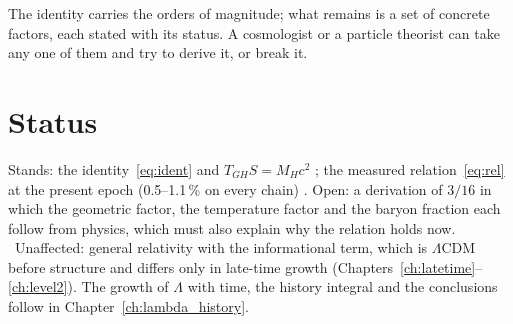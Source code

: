 The identity carries the orders of magnitude; what remains is a set of concrete factors, each stated with its status. A cosmologist or a particle theorist can take any one of them and try to derive it, or break it.

\section{Status}
Stands: the identity~\eqref{eq:ident} and $T_{GH}S=M_Hc^2$ \derived; the measured relation~\eqref{eq:rel} at the present epoch
(0.5--1.1\,\% on every chain) \observed. Open: a derivation of $3/16$ in which the geometric factor, the temperature factor and the
baryon fraction each follow from physics, which must also explain why the relation holds now. \openprob\ Unaffected: general
relativity with the informational term, which is $\Lambda$CDM before structure and differs only in late-time growth
(Chapters~\ref{ch:latetime}--\ref{ch:level2}). The growth of $\Lambda$ with time, the history integral and the conclusions follow in
Chapter~\ref{ch:lambda_history}.
